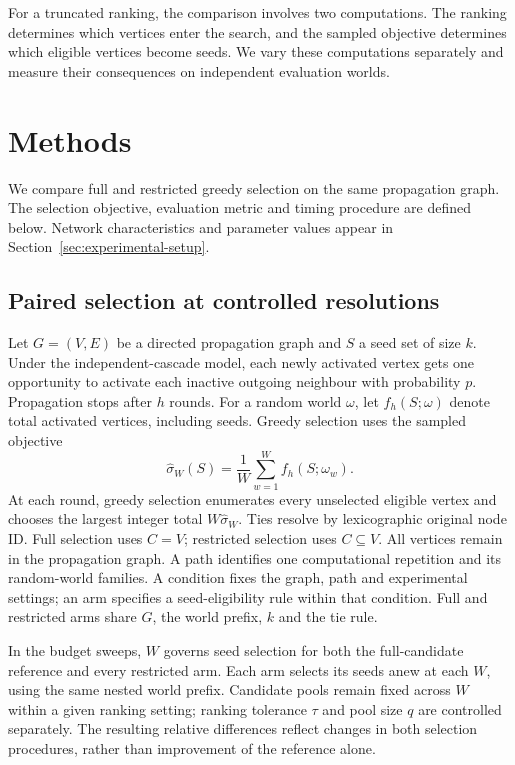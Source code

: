 \documentclass[smallextended]{svjour3}
\begin{document}
For a truncated ranking, the comparison involves two computations. The ranking determines which vertices enter the search, and the sampled objective determines which eligible vertices become seeds. We vary these computations separately and measure their consequences on independent evaluation worlds.

\section{Methods}
We compare full and restricted greedy selection on the same propagation graph. The selection objective, evaluation metric and timing procedure are defined below. Network characteristics and parameter values appear in Section~\ref{sec:experimental-setup}.
\subsection{Paired selection at controlled resolutions}
Let $G=(V,E)$ be a directed propagation graph and $S$ a seed set of size $k$. Under the independent-cascade model, each newly activated vertex gets one opportunity to activate each inactive outgoing neighbour with probability $p$. Propagation stops after $h$ rounds. For a random world $\omega$, let $f_h(S;\omega)$ denote total activated vertices, including seeds. Greedy selection uses the sampled objective
\begin{equation}
\widehat\sigma_W(S)=\frac{1}{W}\sum_{w=1}^{W}f_h(S;\omega_w).
\end{equation}
At each round, greedy selection enumerates every unselected eligible vertex and chooses the largest integer total $W\widehat\sigma_W$. Ties resolve by lexicographic original node ID. Full selection uses $C=V$; restricted selection uses $C\subseteq V$. All vertices remain in the propagation graph. A path identifies one computational repetition and its random-world families. A condition fixes the graph, path and experimental settings; an arm specifies a seed-eligibility rule within that condition. Full and restricted arms share $G$, the world prefix, $k$ and the tie rule.

In the budget sweeps, $W$ governs seed selection for both the full-candidate reference and every restricted arm. Each arm selects its seeds anew at each $W$, using the same nested world prefix. Candidate pools remain fixed across $W$ within a given ranking setting; ranking tolerance $\tau$ and pool size $q$ are controlled separately. The resulting relative differences reflect changes in both selection procedures, rather than improvement of the reference alone.
\end{document}
